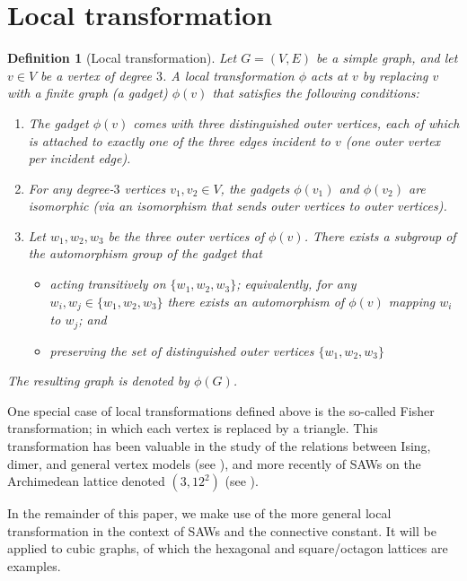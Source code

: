\documentclass[12pt]{amsart}
\theoremstyle{plain}
\newtheorem{definition}[theorem]{Definition}
\numberwithin{equation}{section}
\numberwithin{theorem}{section}
\numberwithin{figure}{section}
\begin{document}
\section{Local transformation} \label{sec:fisher}


\begin{definition}[Local transformation]\label{df31}
Let $G=(V,E)$ be a simple graph, and let $v\in V$ be a vertex of degree $3$.
A \emph{local transformation} $\phi$ acts at $v$ by replacing $v$ with a finite
graph (a \emph{gadget}) $\phi(v)$ that satisfies the following conditions:
\begin{enumerate}
\item The gadget $\phi(v)$ comes with three distinguished \emph{outer vertices},
      each of which is attached to exactly one of the three edges incident to $v$
      (one outer vertex per incident edge).
\item For any degree-$3$ vertices $v_1,v_2\in V$, the gadgets $\phi(v_1)$ and $\phi(v_2)$
      are isomorphic (via an isomorphism that sends outer vertices to outer vertices).
\item Let $w_1,w_2,w_3$ be the three outer vertices of $\phi(v)$. There exists a subgroup of the automorphism group
      of the gadget that
    \begin{itemize}  
\item       acting transitively on $\{w_1,w_2,w_3\}$; equivalently, for any
      $w_i,w_j\in\{w_1,w_2,w_3\}$ there exists an automorphism of $\phi(v)$ mapping $w_i$ to $w_j$; and
      \item preserving the set of distinguished outer vertices $\{w_1,w_2,w_3\}$
      \end{itemize}
\end{enumerate}
The resulting graph is denoted by $\phi(G)$. 
\end{definition}


One special case of local transformations defined above is the so-called Fisher transformation; in which each vertex is replaced by a triangle.
This transformation has been valuable in the study of
the relations between Ising, dimer, and general vertex models 
(see \cite{bdet,fisher,zli,li}), and more recently of SAWs
on the Archimedean lattice denoted $(3,12^2)$ (see \cite{g,jg}). 


In the remainder of this paper, we make use of the more general local transformation in the context of 
SAWs and the connective constant. It will be applied to cubic graphs, of which the 
hexagonal and square/octagon lattices are examples.
\end{document}
